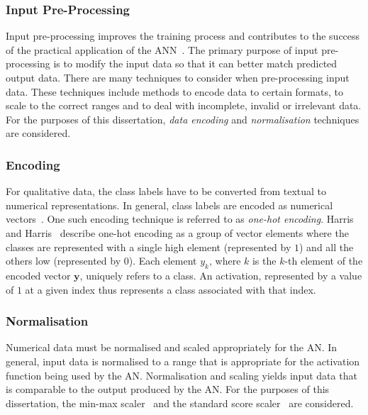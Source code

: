 \subsubsection{Input Pre-Processing}\label{sec:anns:an:input:input_pre_processing}

Input pre-processing improves the training process and contributes to the success of the practical application of the \acs{ANN}~\cite{ref:kuzniar:2017}. The primary purpose of input pre-processing is to modify the input data so that it can better match predicted output data. There are many techniques to consider when pre-processing input data. These techniques include methods to encode data to certain formats, to scale to the correct ranges and to deal with incomplete, invalid or irrelevant data. For the purposes of this dissertation, \textit{data encoding} and \textit{normalisation} techniques are considered.


\subsubsection{Encoding}\label{sec:anns:an:input:encoding}

For qualitative data, the class labels have to be converted from textual to numerical representations. In general, class labels are encoded as numerical vectors~\cite{ref:brownlee:2017:one-hot}. One such encoding technique is referred to as \textit{one-hot encoding}. Harris and Harris~\cite{ref:harris:2010} describe one-hot encoding as a group of vector elements where the classes are represented with a single high element (represented by $1$) and all the others low (represented by $0$). Each element $y_k$, where $k$ is the $k$-th element of the encoded vector $\boldsymbol{y}$, uniquely refers to a class. An activation, represented by a value of $1$ at a given index thus represents a class associated with that index.

\subsubsection{Normalisation}\label{sec:anns:an:input:normalisation}

Numerical data must be normalised and scaled appropriately for the \acs{AN}. In general, input data is normalised to a range that is appropriate for the activation function being used by the \acs{AN}. Normalisation and scaling yields input data that is comparable to the output produced by the \acs{AN}. For the purposes of this dissertation, the min-max scaler~\cite{ref:al:2006} and the standard score scaler~\cite{ref:jain:2005} are considered.

